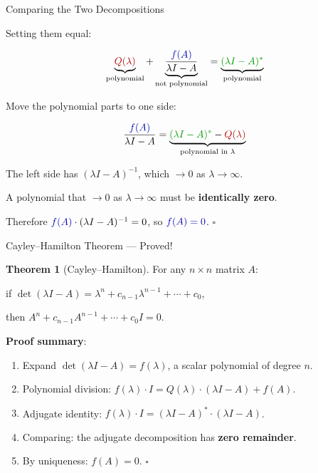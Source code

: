 \documentclass[10pt]{beamer}
\theoremstyle{definition}
\newtheorem{thm}{Theorem}[section]
\newcommand{\x}[1]{\alert{\textbf{#1}}}
\newcommand{\rd}[1]{{\color{red!70!black}#1}}
\newcommand{\bl}[1]{{\color{blue!70!black}#1}}
\newcommand{\gn}[1]{{\color{green!60!black}#1}}
\begin{document}
\begin{frame}{Comparing the Two Decompositions}

\vfill

Setting them equal:

$$\underbrace{\rd{Q(\lambda)}}_{\text{polynomial}} + \underbrace{\frac{\bl{f(A)}}{\lambda I - A}}_{\text{not polynomial}} = \underbrace{\gn{(\lambda I - A)^*}}_{\text{polynomial}}$$

\vfill

Move the polynomial parts to one side:

$$\frac{\bl{f(A)}}{\lambda I - A} = \underbrace{\gn{(\lambda I - A)^*} - \rd{Q(\lambda)}}_{\text{polynomial in } \lambda}$$

\vfill

The left side has $(\lambda I - A)^{-1}$, which $\to 0$ as $\lambda \to \infty$.

\vfill

A polynomial that $\to 0$ as $\lambda \to \infty$ must be \x{identically zero}.

\vfill

Therefore $\bl{f(A)} \cdot (\lambda I - A)^{-1} = 0$, \quad so \quad $\bl{f(A) = 0}$. \qquad $\square$

\vfill
\end{frame}


\begin{frame}{Cayley--Hamilton Theorem --- Proved!}

\begin{thm}[Cayley--Hamilton]
For any $n \times n$ matrix $A$:

if\; $\det(\lambda I - A) = \lambda^n + c_{n-1}\lambda^{n-1} + \cdots + c_0$,

then\; $A^n + c_{n-1}A^{n-1} + \cdots + c_0 I = 0$.
\end{thm}

\vfill

\x{Proof summary}:

\begin{enumerate}
\item Expand $\det(\lambda I - A) = f(\lambda)$, a scalar polynomial of degree $n$.

\item Polynomial division: \;$f(\lambda)\cdot I = Q(\lambda)\cdot(\lambda I-A) + f(A)$.

\item Adjugate identity: \;$f(\lambda)\cdot I = (\lambda I-A)^* \cdot (\lambda I - A)$.

\item Comparing: the adjugate decomposition has \x{zero remainder}.

\item By uniqueness: $f(A) = 0$. \quad $\square$
\end{enumerate}

\vfill
\end{frame}
\end{document}
